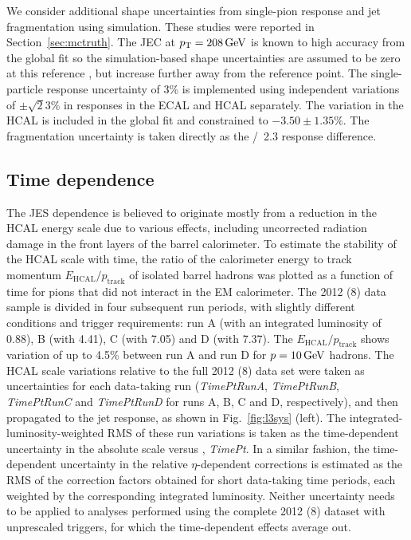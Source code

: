 \documentclass[11pt,twoside,a4paper,cmspaper,final,collab]{cms-tdr}
\begin{document}
We consider additional shape uncertainties from single-pion response and jet fragmentation using simulation.
These studies were reported in Section~\ref{sec:mctruth}. The JEC at $p_{\mathrm{T}}=208\,\text{Ge\hspace{-.08em}V}$ is known to high accuracy from the global fit so the simulation-based shape uncertainties are assumed to be zero at this reference \pt, but increase further away from the reference point. The single-particle response uncertainty of 3\% is implemented using independent variations of $\pm \sqrt{2} 3$\% in responses in the ECAL and HCAL separately. The variation in the HCAL is included in the global fit and constrained to $-3.50\pm1.35$\%.
The fragmentation uncertainty is taken directly as the /\HERWIGpp~2.3 response difference.

\subsection*{Time dependence}

The JES \pt dependence is believed to originate mostly from a reduction in the HCAL energy scale due to various effects, including uncorrected radiation damage in the front layers of the barrel calorimeter. To estimate the stability of the HCAL scale with time, the ratio of the calorimeter energy to track momentum $E_\mathrm{HCAL}/p_\mathrm{track}$ of isolated barrel hadrons was plotted as a function of time for pions that did not interact in the EM calorimeter.
The 2012 (8\TeV) data sample is divided in four subsequent run periods, with slightly different conditions and trigger requirements: run A (with an integrated luminosity of 0.88\fbinv), B (with 4.41\fbinv), C (with 7.05\fbinv) and D (with 7.37\fbinv). The $E_\mathrm{HCAL}/p_\mathrm{track}$ shows variation of up to 4.5\% between run A and run D for $p=10\,\text{Ge\hspace{-.08em}V}$ hadrons.
The HCAL scale variations relative to the full 2012 (8\TeV) data set were taken as uncertainties for each data-taking run (\textit{TimePtRunA}, \textit{TimePtRunB}, \textit{TimePtRunC} and \textit{TimePtRunD} for runs A, B, C and D, respectively), and then propagated to the jet response, as shown in Fig.~\ref{fig:l3sys} (left). The integrated-luminosity-weighted RMS of these run variations is taken as the time-dependent uncertainty in the absolute scale versus \pt, \textit{TimePt}. In a similar fashion, the time-dependent uncertainty in the relative $\eta$-dependent corrections is estimated as the RMS of the correction factors obtained for short data-taking time periods, each weighted by the corresponding integrated luminosity. Neither uncertainty needs to be applied to analyses performed using the complete 2012 (8\TeV) dataset with unprescaled triggers, for which the time-dependent effects average out.
\end{document}

